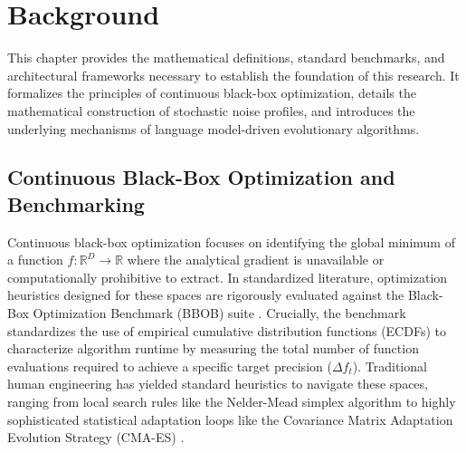 



\chapter{Background}\label{chap:Background}



This chapter provides the mathematical definitions, standard benchmarks, and architectural frameworks necessary to establish the foundation of this research. It formalizes the principles of continuous black-box optimization, details the mathematical construction of stochastic noise profiles, and introduces the underlying mechanisms of language model-driven evolutionary algorithms.

\section{Continuous Black-Box Optimization and Benchmarking}\label{sec:bg_optimization}


Continuous black-box optimization focuses on identifying the global minimum of a function $f: \mathbb{R}^D \rightarrow \mathbb{R}$ where the analytical gradient is unavailable or computationally prohibitive to extract. In standardized literature, optimization heuristics designed for these spaces are rigorously evaluated against the Black-Box Optimization Benchmark (BBOB) suite \cite{Hansen2010}. Crucially, the benchmark standardizes the use of empirical cumulative distribution functions (ECDFs) to characterize algorithm runtime by measuring the total number of function evaluations required to achieve a specific target precision ($\Delta f_t$). Traditional human engineering has yielded standard heuristics to navigate these spaces, ranging from local search rules like the Nelder-Mead simplex algorithm \cite{Nelder1965} to highly sophisticated statistical adaptation loops like the Covariance Matrix Adaptation Evolution Strategy (CMA-ES) \cite{Hansen2001}.

